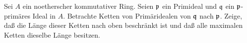 \begin{exercise}
	Sei \(A\) ein noetherscher kommutativer Ring. Seien \(\mathfrak{p}\) ein Primideal und \(\mathfrak{q}\) ein
	\(\mathfrak{p}\)-primäres Ideal in \(A\). Betrachte Ketten von Primäridealen von \(\mathfrak{q}\) nach \(\mathfrak{p}\).
	Zeige, daß die Länge dieser Ketten nach oben beschränkt ist und daß alle maximalen Ketten dieselbe Länge besitzen.
\end{exercise}

